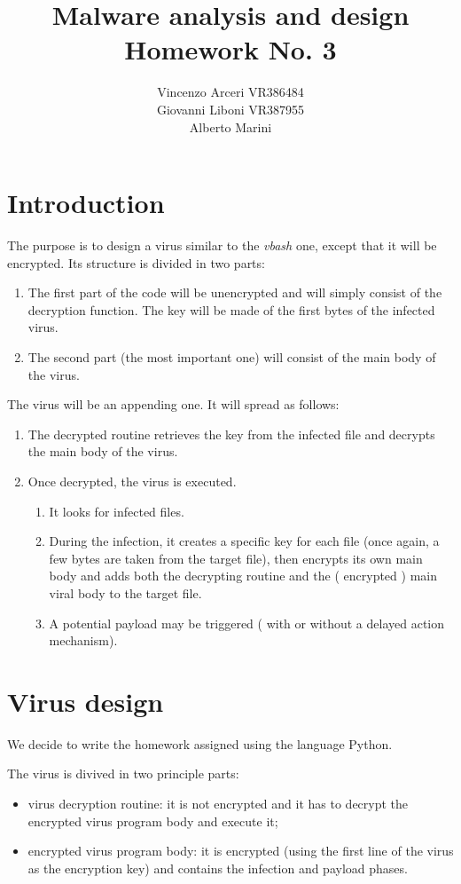 \documentclass[a4paper,11pt]{article}
\begin{document}
\author{Vincenzo Arceri VR386484 \\ Giovanni Liboni VR387955 \\ Alberto Marini}
\title{Malware analysis and design \\ Homework No. 3}
\maketitle

\section{Introduction}
The purpose is to design a virus similar to the \textit{vbash} one, except that it will be encrypted. Its structure is divided in two parts:
\begin{enumerate}
\item The first part of the code will be unencrypted and will simply consist of the decryption function. The key will be made of the first bytes of the infected virus.
\item The second part (the most important one) will consist of the main body of the virus.
\end{enumerate}
The virus will be an appending one. It will spread as follows:
\begin{enumerate}
\item The decrypted routine retrieves the key from the infected file and decrypts the main body of the virus.
\item Once decrypted, the virus is executed.
\begin{enumerate}
\item It looks for infected files.
\item During the infection, it creates a specific key for each file (once again, a few bytes are taken from the target file), then encrypts its own main body and adds both the decrypting routine and the ( encrypted ) main viral body to the target file.
\item A potential payload may be triggered ( with or without a delayed action mechanism).
\end{enumerate}
\end{enumerate}
\section{Virus design}
We decide to write the homework assigned using the language Python.

The virus is divived in two principle parts:
\begin{itemize}
\item virus decryption routine: it is not encrypted and it has to decrypt the encrypted virus program body and execute it;
\item encrypted virus program body: it is encrypted (using the first line of the virus as the encryption key) and contains the infection and payload phases.
\end{itemize}
\end{document}
